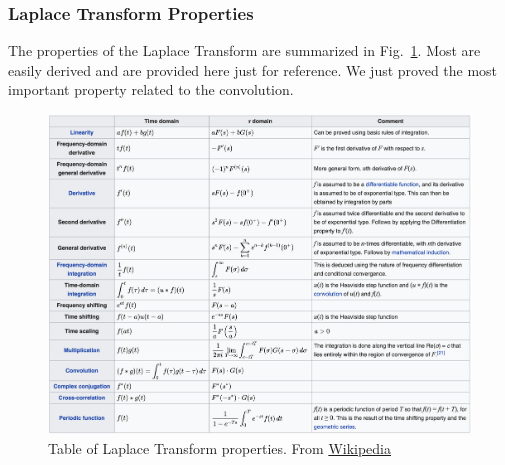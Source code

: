 \subsubsection{Laplace Transform Properties}
The properties of the Laplace Transform are summarized in Fig.~\ref{fig:laplace_table}.   Most are easily derived and are provided here just for reference.  We just proved the most important property related to the convolution.    
\begin{figure}[tb]
\begin{center}
\includegraphics[width=.9\columnwidth]{laplace_table.png}
\end{center}
\caption{Table of Laplace Transform properties.  From \href{https://en.Wikipedia.org/wiki/Laplace_transform}{Wikipedia}}
\label{fig:laplace_table}
\end{figure}

